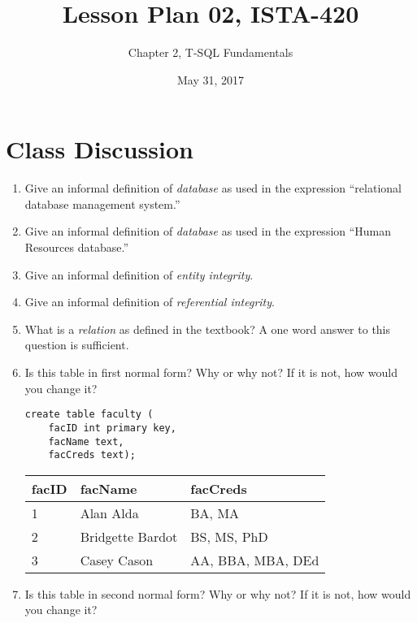 \documentclass{article}
\title{Lesson Plan 02, ISTA-420}
\author{Chapter 2, T-SQL Fundamentals}
\date{May 31, 2017}
\begin{document}
    

    \maketitle{}

    \section{Class Discussion}
    \begin{enumerate}

        \item Give an informal definition of \textit{database} as used in the expression ``relational database management system.''


        \item Give an informal definition of \textit{database} as used in the expression ``Human Resources database.''


        \item Give an informal definition of \textit{entity integrity}.


        \item Give an informal definition of \textit{referential integrity}.


        \item What is a \textit{relation} as defined in the textbook? A one word answer to this question is sufficient.


        \item Is this table in first normal form? Why or why not? If it is not, how would you change it?

            \begin{verbatim}
create table faculty (
    facID int primary key,
    facName text,
    facCreds text);
            \end{verbatim}

            \begin{tabular}{| l | l | l |}
\hline
\textbf{facID} & \textbf{facName} & \textbf{facCreds} \\
\hline
1 & Alan Alda & BA, MA \\
\hline
2 & Bridgette Bardot & BS, MS, PhD \\
\hline
3 & Casey Cason & AA, BBA, MBA, DEd \\
\hline

            \end{tabular}

        \item Is this table in second normal form? Why or why not? If it is not, how would you change it?


\end{enumerate}
\end{document}
